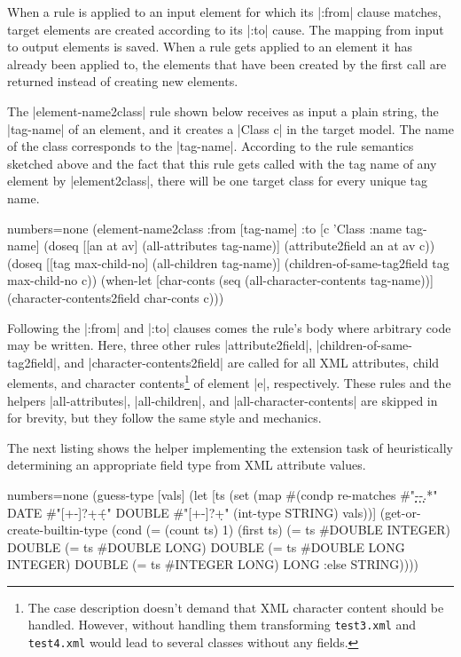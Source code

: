 \documentclass[submission]{eptcs}
\newcommand{\code}{\clojureinline}
\begin{document}
When a rule is applied to an input element for which its \code|:from| clause
matches, target elements are created according to its \code|:to| cause.  The
mapping from input to output elements is saved.  When a rule gets applied to an
element it has already been applied to, the elements that have been created by
the first call are returned instead of creating new elements.

The \code|element-name2class| rule shown below receives as input a plain
string, the \code|tag-name| of an element, and it creates a \code|Class c| in
the target model.  The name of the class corresponds to the \code|tag-name|.
According to the rule semantics sketched above and the fact that this rule gets
called with the tag name of any element by \code|element2class|, there will be
one target class for every unique tag name.

\begin{clojurecode*}{numbers=none}
  (element-name2class
   :from [tag-name]
   :to   [c 'Class {:name tag-name}]
   (doseq [[an at av] (all-attributes tag-name)]
     (attribute2field an at av c))
   (doseq [[tag max-child-no] (all-children tag-name)]
     (children-of-same-tag2field tag max-child-no c))
   (when-let [char-conts (seq (all-character-contents tag-name))]
     (character-contents2field char-conts c)))
\end{clojurecode*}

Following the \code|:from| and \code|:to| clauses comes the rule's body where
arbitrary code may be written.  Here, three other rules \code|attribute2field|,
\code|children-of-same-tag2field|, and \code|character-contents2field| are
called for all XML attributes, child elements, and character
contents\footnote{The case description doesn't demand that XML character
  content should be handled.  However, without handling them transforming
  \texttt{test3.xml} and \texttt{test4.xml} would lead to several classes
  without any fields.}  of element \code|e|, respectively.  These rules and the
helpers \code|all-attributes|, \code|all-children|, and
\code|all-character-contents| are skipped in for brevity, but they follow the
same style and mechanics.

The next listing shows the helper implementing the extension task of
heuristically determining an appropriate field type from XML attribute values.

\begin{clojurecode*}{numbers=none}
  (guess-type [vals]
   (let [ts (set (map #(condp re-matches %
                         #"\d\d\d\d-\d\d-\d\d.*" DATE
                         #"[+-]?\d+\.\d+"        DOUBLE
                         #"[+-]?\d+"             (int-type %
                         STRING) vals))]
     (get-or-create-builtin-type
      (cond
       (= (count ts) 1)              (first ts)
       (= ts #{DOUBLE INTEGER})      DOUBLE
       (= ts #{DOUBLE LONG})         DOUBLE
       (= ts #{DOUBLE LONG INTEGER}) DOUBLE
       (= ts #{INTEGER LONG})        LONG
       :else                         STRING))))
\end{clojurecode*}
\end{document}
